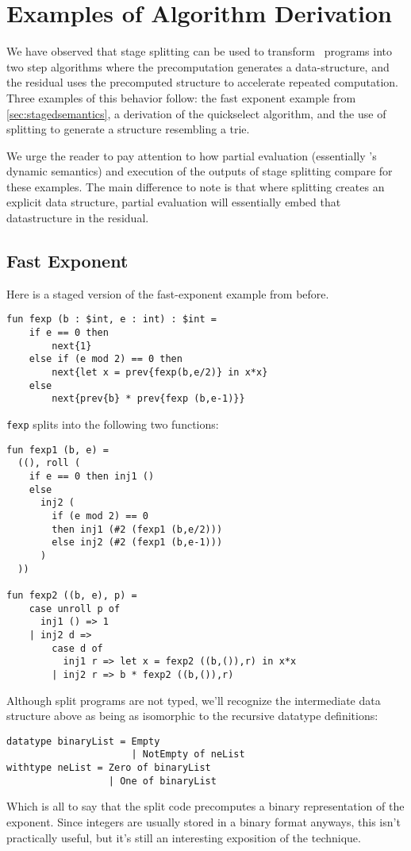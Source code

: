 

\section{Examples of Algorithm Derivation}
\label{sec:examples}

We have observed that stage splitting can be used to transform \lang\ programs into two step algorithms where the precomputation generates a data-structure, and the residual uses the precomputed structure to accelerate repeated computation.  Three examples of this behavior follow: the fast exponent example from \ref{sec:stagedsemantics}, a derivation of the quickselect algorithm, and the use of splitting to generate a structure resembling a trie.
 
We urge the reader to pay attention to how partial evaluation (essentially \lang's dynamic semantics) and execution of the outputs of stage splitting compare for these examples.
The main difference to note is that where splitting creates an explicit data structure, partial evaluation will
essentially embed that datastructure in the residual. 

\subsection{Fast Exponent}

Here is a staged version of the fast-exponent example from before.
\begin{lstlisting} 
fun fexp (b : $int, e : int) : $int =
	if e == 0 then
		next{1}
	else if (e mod 2) == 0 then
		next{let x = prev{fexp(b,e/2)} in x*x}
	else
		next{prev{b} * prev{fexp (b,e-1)}}		
\end{lstlisting}

\noindent
{\tt fexp} splits into the following two functions:

\begin{lstlisting} 
fun fexp1 (b, e) =
  ((), roll (
    if e == 0 then inj1 ()
    else
      inj2 (
        if (e mod 2) == 0
        then inj1 (#2 (fexp1 (b,e/2)))
        else inj2 (#2 (fexp1 (b,e-1)))
      )
  ))

fun fexp2 ((b, e), p) =
	case unroll p of
	  inj1 () => 1
	| inj2 d =>
		case d of
		  inj1 r => let x = fexp2 ((b,()),r) in x*x
		| inj2 r => b * fexp2 ((b,()),r)
\end{lstlisting}

Although split programs are not typed, we'll recognize the intermediate data structure 
above as being as isomorphic to the recursive datatype definitions:
\begin{lstlisting} 
datatype binaryList = Empty 
                      | NotEmpty of neList
withtype neList = Zero of binaryList 
                  | One of binaryList
\end{lstlisting}
Which is all to say that the split code precomputes a binary representation of the exponent.
Since integers are usually stored in a binary format anyways, this isn't practically useful,
but it's still an interesting exposition of the technique.

